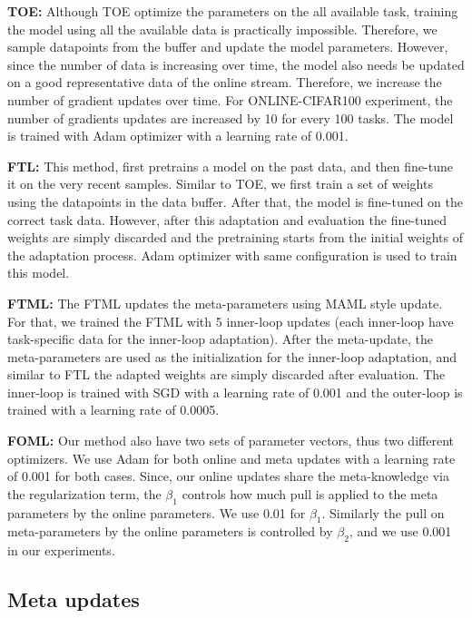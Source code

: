 \textbf{TOE:} Although TOE optimize the parameters on the all available task, training the model using all the available data is practically impossible. Therefore, we sample datapoints from the buffer and update the model parameters. However, since the number of data is increasing over time, the model also needs be updated on a good representative data of the online stream. Therefore, we increase the number of gradient updates over time. For ONLINE-CIFAR100 experiment, the number of gradients updates are increased by 10 for every 100 tasks. The model is trained with Adam optimizer with a learning rate of 0.001. 

\textbf{FTL:} This method, first pretrains a model on the past data, and then fine-tune it on the very recent samples. Similar to TOE, we first train a set of weights using the datapoints in the data buffer. After that, the model is fine-tuned on the correct task data. However, after this adaptation and evaluation the fine-tuned weights are simply discarded and the pretraining starts from the initial weights of the adaptation process. Adam optimizer with same configuration is used to train this model. 

\textbf{FTML:} The FTML updates the meta-parameters using MAML style update. For that, we trained the FTML with 5 inner-loop updates (each inner-loop have task-specific data for the inner-loop adaptation). After the meta-update, the meta-parameters are used as the initialization for the inner-loop adaptation, and similar to FTL the adapted weights are simply discarded after evaluation. The inner-loop is trained with SGD with a learning rate of 0.001 and the outer-loop is trained with a learning rate of 0.0005.

\textbf{FOML:} Our method also have two sets of parameter vectors, thus two different optimizers. We use Adam for both online and meta updates with a learning rate of 0.001 for both cases. Since, our online updates share the meta-knowledge via the regularization term, the $\beta_1$ controls how much pull is applied to the meta parameters by the online parameters. We use 0.01 for $\beta_1$. Similarly the pull on meta-parameters by the online parameters is controlled by $\beta_2$, and we use 0.001 in our experiments.

\vspace{-0.4cm}
\subsection{Meta updates}
\vspace{-0.2cm}
\label{sec:A4}

